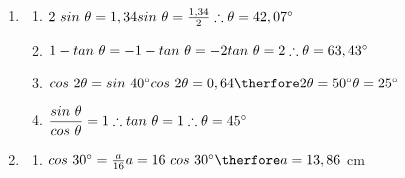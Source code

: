 \begin{eocsolutions}{}
{\begin{enumerate}[itemsep=6pt, label=\textbf{\arabic*}. ]
    \begin{enumerate}[itemsep=1pt, label=\textbf{(\alph*)} ]
\item $cos~\alpha = \frac{x}{r} = \frac{-3}{\sqrt{34}}$%
    \item $tan^2\alpha - sec^2\alpha \\
=\left(\frac{y}{x}\right)^2 - \left(\frac{r}{x}\right)^2\\
=\left(\frac{5}{-3}\right)^2 - \left(\frac{\sqrt{34}}{-3}\right)^2\\
=\frac{25}{9} - \frac{34}{9}\\
= \frac{-9}{9}\\
=-1$%
    \end{enumerate}

\item    
\begin{multicols}{2}
 \begin{enumerate}[itemsep=3pt, label=\textbf{(\alph*)} ]
     \item $2 ~sin~\theta= 1,34\\sin~\theta=\frac{1,34}{2}\\\therefore \theta=42,07^{\circ}$%
    \item $1-tan~\theta = -1\\ -tan~\theta = -2\\tan~\theta = 2\\ \therefore \theta=63,43^{\circ}$%
    \item $cos~2\theta = sin~40^{\circ}\\ cos~2\theta = 0,64\\ \therfore 2\theta = 50^{\circ}\\ \theta = 25^{\circ}$%
    \item $\dfrac{sin~\theta}{cos~\theta} = 1\\ \therefore tan~\theta = 1\\ \therefore \theta=45^{\circ}$%
    \end{enumerate}
\end{multicols}
\item 
\begin{multicols}{2}
    \begin{enumerate}[itemsep=3pt, label=\textbf{(\alph*)} ]
\item$cos~30^{\circ} =\frac{a}{16}\\ a = 16~cos~30^{\circ} \\ \therfore a=13,86$ cm

\end{enumerate}
\end{multicols}
\end{enumerate}}
\end{eocsolutions}
